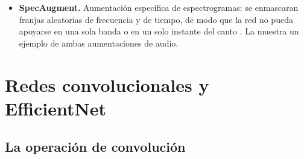 \begin{itemize}[leftmargin=*, itemsep=2pt]
\begin{equation}
          \tilde{\mathbf{t}} = \lambda \mathbf{t}_i + (1-\lambda)\mathbf{t}_j, \qquad
          \lambda \sim \mathrm{Beta}(a, a),
          \label{eq:mixup}
        \end{equation}
        lo que obliga a la red a comportarse de forma suave entre ejemplos y
        reduce la memorización. Aquí $a = 0{,}2$.
  \item \textbf{SpecAugment.} Aumentación específica de espectrogramas: se
        enmascaran franjas aleatorias de frecuencia y de tiempo, de modo que
        la red no pueda apoyarse en una sola banda o en un solo instante del
        canto \citep{park2019specaugment}. La
         muestra un ejemplo de ambas
        aumentaciones de audio.
\end{itemize}

\section{Redes convolucionales y EfficientNet}\label{sec:teoria-cnn}

\subsection{La operación de convolución}

